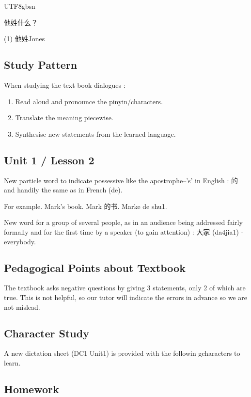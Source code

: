 \documentclass{article}
\newcommand{\myfont}{gbsn} %
\begin{document}
\begin{CJK}{UTF8}{\myfont}
\begin{question}
  他姓什么？
  \begin{tasks}(1)
  \task 他姓Jones
  \end{tasks}
\end{question}

\subsection{Study Pattern}

When studying the text book dialogues :

\begin{enumerate}
\item Read aloud and pronounce the pinyin/characters.
\item Translate the meaning piecewise.
\item Synthesise new statements from the learned language.
\end{enumerate}

\subsection{Unit 1 / Lesson 2}

New particle word to indicate possessive like the apostrophe--'s' in English : 的  and handily the same as in French (de).

For example.  Mark's book.  Mark 的书.  Marke de shu1.

New word for a group of several people, as in an audience being addressed fairly formally and for the first time by a speaker (to gain attention) : 大家 (da4jia1)  - everybody.

\subsection{Pedagogical Points about Textbook}

The textbook asks negative questions by giving 3 statements, only 2 of which are true.  This is not helpful, so our tutor will indicate the errors in advance so we are not mislead.

\subsection{Character Study}

A new dictation sheet (DC1 Unit1) is provided with the followin gcharacters to learn.


\subsection{Homework}


\end{CJK}
\end{document}
